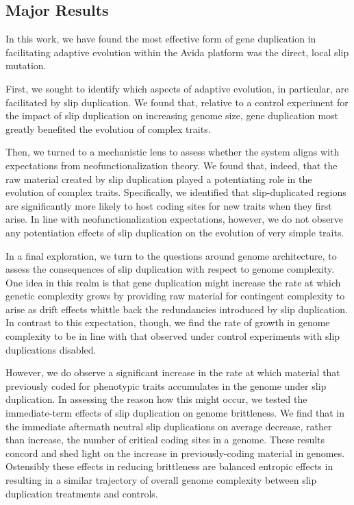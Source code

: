 \subsection{Major Results}

In this work, we have found the most effective form of gene duplication in facilitating adaptive evolution within the Avida platform was the direct, local slip mutation.

First, we sought to identify which aspects of adaptive evolution, in particular, are facilitated by slip duplication.
We found that, relative to a control experiment for the impact of slip duplication on increasing genome size, gene duplication most greatly benefited the evolution of complex traits.

Then, we turned to a mechanistic lens to assess whether the system aligns with expectations from neofunctionalization theory.
We found that, indeed, that the raw material created by slip duplication played a potentiating role in the evolution of complex traits.
Specifically, we identified that slip-duplicated regions are significantly more likely to host coding sites for new traits when they first arise.
In line with neofunctionalization expectations, however, we do not observe any potentiation effects of slip duplication on the evolution of very simple traits.

In a final exploration, we turn to the questions around genome architecture, to assess the consequences of slip duplication with respect to genome complexity.
One idea in this realm is that gene duplication might increase the rate at which genetic complexity grows by providing raw material for contingent complexity to arise as drift effects whittle back the redundancies introduced by slip duplication.
In contrast to this expectation, though, we find the rate of growth in genome complexity to be in line with that observed under control experiments with slip duplications disabled.

However, we do observe a significant increase in the rate at which material that previously coded for phenotypic traits accumulates in the genome under slip duplication.
In assessing the reason how this might occur, we tested the immediate-term effects of slip duplication on genome brittleness.
We find that in the immediate aftermath neutral slip duplications on average decrease, rather than increase, the number of critical coding sites in a genome.
These results concord and shed light on the increase in previously-coding material in genomes.
Ostensibly these effects in reducing brittleness are balanced entropic effects in resulting in a similar trajectory of overall genome complexity between slip duplication treatments and controls.

